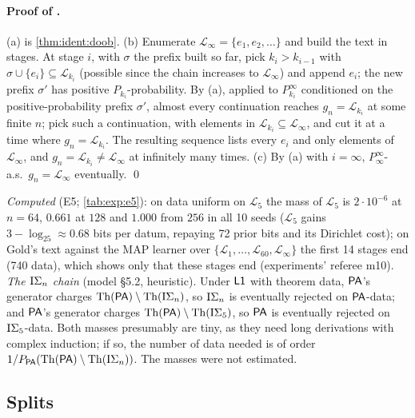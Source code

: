 \paragraph{Proof of .} (a) is \cref{thm:ident:doob}. (b) Enumerate $\mathcal L_\infty=\{e_1,e_2,\dots\}$ and build the text in stages. At stage $i$, with $\sigma$ the prefix built so far, pick $k_i>k_{i-1}$ with $\sigma\cup\{e_i\}\subseteq \mathcal L_{k_i}$ (possible since the chain increases to $\mathcal L_\infty$) and append $e_i$; the new prefix $\sigma'$ has positive $P_{k_i}$-probability. By (a), applied to $P_{k_i}^\infty$ conditioned on the positive-probability prefix $\sigma'$, almost every continuation reaches $g_n=\mathcal L_{k_i}$ at some finite $n$; pick such a continuation, with elements in $\mathcal L_{k_i}\subseteq \mathcal L_\infty$, and cut it at a time where $g_n=\mathcal L_{k_i}$. The resulting sequence lists every $e_i$ and only elements of $\mathcal L_\infty$, and $g_n=\mathcal L_{k_i}\ne \mathcal L_\infty$ at infinitely many times. (c) By (a) with $i=\infty$, $P_\infty^\infty$-a.s.\ $g_n=\mathcal L_\infty$ eventually. \qed

\emph{Computed} (E5; \cref{tab:exp:e5}): on data uniform on $\mathcal L_5$ the mass of $\mathcal L_5$ is $2\cdot10^{-6}$ at $n=64$, $0.661$ at $128$ and $1.000$ from $256$ in all 10 seeds ($\mathcal L_5$ gains $3-\log_25\approx0.68$ bits per datum, repaying 72 prior bits and its Dirichlet cost); on Gold's text against the MAP learner over $\{\mathcal L_1,\dots,\mathcal L_{60},\mathcal L_\infty\}$ the first 14 stages end (740 data), which shows only that these stages end (experiments' referee m10).
\emph{The $\mathrm{I}\Sigma_{n}$ chain} (model \S5.2, heuristic). Under $\mathord{\mathsf{L1}}$ with theorem data, $\mathsf{PA}$'s generator charges $\mathrm{Th}(\mathsf{PA})\setminus\mathrm{Th}(\mathrm{I}\Sigma_{n})$, so $\mathrm{I}\Sigma_{n}$ is eventually rejected on $\mathsf{PA}$-data; and $\mathsf{PA}$'s generator charges $\mathrm{Th}(\mathsf{PA})\setminus\mathrm{Th}(\mathrm{I}\Sigma_{5})$, so $\mathsf{PA}$ is eventually rejected on $\mathrm{I}\Sigma_{5}$-data. Both masses presumably are tiny, as they need long derivations with complex induction; if so, the number of data needed is of order $1/P_{\mathsf{PA}}(\mathrm{Th}(\mathsf{PA})\setminus\mathrm{Th}(\mathrm{I}\Sigma_{n}))$. The masses were not estimated.

\subsection{Splits}\label{app:ident:mdl}

